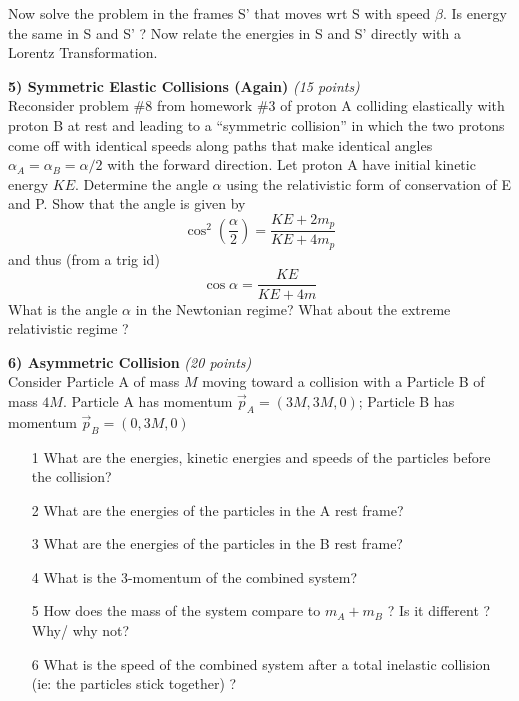 {Now solve the problem in the frames S' that moves wrt S with speed $\beta$. 
Is energy the same in S and S' ?
Now relate the energies in S and S' directly with a Lorentz Transformation.


\textbf{5) Symmetric Elastic Collisions (Again) } \hfill \textit{(15 points)}\\
Reconsider problem \#8 from homework \#3 of proton A colliding elastically with proton B at rest and leading to a ``symmetric collision'' in which the two protons come off with identical speeds along paths that make identical angles $\alpha_A = \alpha_B = \alpha/2$ with the forward direction.
Let proton A have initial kinetic energy $KE$.  
Determine the angle $\alpha$ using the relativistic form of conservation of E and P. 
Show that the angle is given by
\begin{equation*}
\cos^2\left( \frac{\alpha}{2}\right) = \frac{KE + 2m_p}{KE + 4m_p}
\end{equation*}
and thus (from a trig id)
\begin{equation*}
\cos \alpha = \frac{KE}{ KE + 4m}
\end{equation*}
What is the angle $\alpha$ in the Newtonian regime? What about the extreme relativistic regime ?

\vspace*{0.25in}

\textbf{6) Asymmetric Collision  } \hfill \textit{(20 points)}\\
Consider Particle A of mass $M$ moving toward a collision with a Particle B of mass $4M$.
Particle A has momentum $\vec{p}_A=(3M,3M,0)$; Particle B has momentum $\vec{p}_B=(0,3M,0)$
\begin{itemize}
\item[1] What are the energies, kinetic energies and speeds of the particles before the collision?  
\item[2] What are the energies of the particles in the A rest frame?
\item[3] What are the energies of the particles in the B rest frame?
\item[4] What is the 3-momentum of the combined system?
\item[5] How does the mass of the system compare to $m_A + m_B$ ? Is it different ? Why/ why not?
\item[6] What is the speed of the combined system after a total inelastic collision (ie: the particles stick together) ?
\end{itemize}


\vspace*{0.25in}

}
